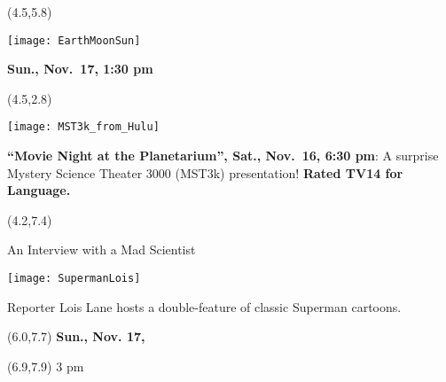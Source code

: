 \documentclass{article}
\begin{document}
 \begin{textblock}{3.2}(4.5,5.8)

   {\fontsize{16}{17}

   \texttt{[image: EarthMoonSun]}

   \textbf{Sun., Nov.~17, 1:30 pm}

   }

\end{textblock}

\begin{textblock}{3.2}(4.5,2.8)

   \texttt{[image: MST3k\_from\_Hulu]}

   {\fontsize{16}{17}
   \textbf{“Movie Night at the Planetarium”, Sat., Nov.~16, 6:30 pm}:
    A surprise Mystery Science Theater 3000 (MST3k) presentation! 
    \textbf{Rated TV14 for Language.}

    }

\end{textblock}

\begin{textblock}{3.5}(4.2,7.4)
   {\fontsize{16}{17}

   \begin{centering}

   An Interview with a Mad Scientist 

   \end{centering}

   \texttt{[image: SupermanLois]}

   Reporter Lois Lane hosts a double-feature of classic Superman cartoons. 

   }
\end{textblock}

   {\fontsize{16}{17}

\begin{textblock}{1.2}(6.0,7.7)
   \textbf{Sun., Nov. 17,}
\end{textblock}
\begin{textblock}{2}(6.9,7.9)
   3 pm
\end{textblock}

   }
\end{document}
